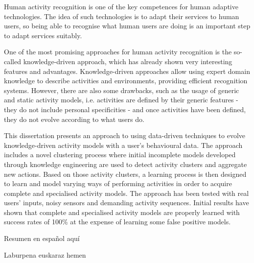 




\begin{abstracts}        %

Human activity recognition is one of the key competences for human adaptive technologies. The idea of such technologies is to adapt their services to human users, so being able to recognise what human users are doing is an important step to adapt services suitably. 

One of the most promising approaches for human activity recognition is the so-called knowledge-driven approach, which has already shown very interesting features and advantages. Knowledge-driven approaches allow using expert domain knowledge to describe activities and environments, providing efficient recognition systems. However, there are also some drawbacks, such as the usage of generic and static activity models, i.e. activities are defined by their generic features - they do not include personal specificities - and once activities have been defined, they do not evolve according to what users do.

This dissertation presents an approach to using data-driven techniques to evolve knowledge-driven activity models with a user's behavioural data. The approach includes a novel clustering process where initial incomplete models developed through knowledge engineering are used to detect activity clusters and aggregate new actions. Based on those activity clusters, a learning process is then designed to learn and model varying ways of performing activities in order to acquire complete and specialised activity models. The approach has been tested with real users' inputs, noisy sensors and demanding activity sequences. Initial results have shown that complete and specialised activity models are properly learned with success rates of 100\% at the expense of learning some false positive models.

\end{abstracts}

\begin{resumen}        %

Resumen en espa\~nol aqu\'i


\end{resumen}

\begin{laburpena}        %
 
 Laburpena euskaraz hemen
 
\end{laburpena}





